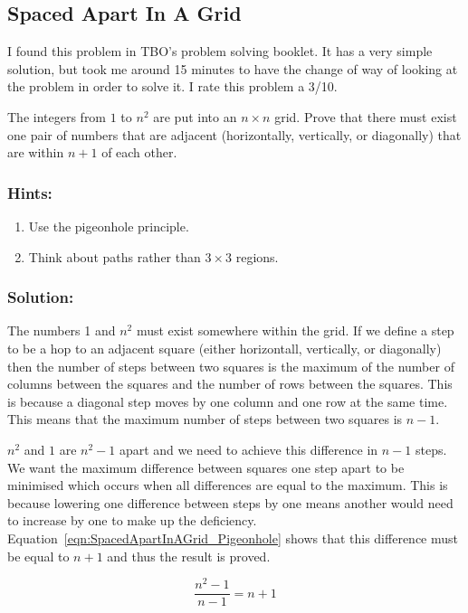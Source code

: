 \subsection{Spaced Apart In A Grid}

I found this problem in TBO's problem solving booklet. It has a very simple solution, but took me around 15 minutes to have the change of way of looking at the problem in order to solve it. I rate this problem a 3/10.

The integers from $1$ to $n^2$ are put into an $n \times n$ grid. Prove that there must exist one pair of numbers that are adjacent (horizontally, vertically, or diagonally) that are within $n + 1$ of each other.

\subsubsection{Hints:}

\begin{enumerate}
	\item Use the pigeonhole principle.
	\item Think about paths rather than $3 \times 3$ regions.
\end{enumerate}

\subsubsection{Solution:}

The numbers 1 and $n^2$ must exist somewhere within the grid. If we define a step to be a hop to an adjacent square (either horizontall, vertically, or diagonally) then the number of steps between two squares is the maximum of the number of columns between the squares and the number of rows between the squares. This is because a diagonal step moves by one column and one row at the same time. This means that the maximum number of steps between two squares is $n - 1$.

$n^2$ and $1$ are $n^2 - 1$ apart and we need to achieve this difference in $n - 1$ steps. We want the maximum difference between squares one step apart to be minimised which occurs when all differences are equal to the maximum. This is because lowering one difference between steps by one means another would need to increase by one to make up the deficiency. Equation~\ref{eqn:SpacedApartInAGrid_Pigeonhole} shows that this difference must be equal to $n + 1$ and thus the result is proved.

\begin{equation}
	\frac{n^2 - 1}{n - 1} = {n + 1}
	\label{eqn:SpacedApartInAGrid_Pigeonhole}
\end{equation}

